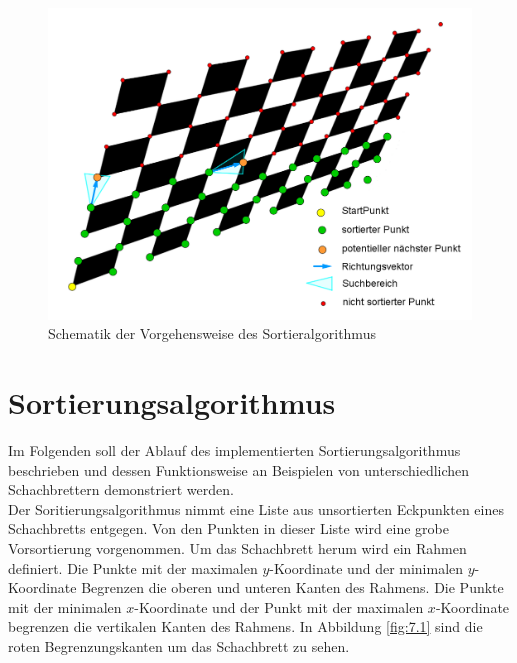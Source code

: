 \begin{figure}[!htb]
	\centering
	\includegraphics[width=0.8\linewidth]{images/VerzeichnetesSchachbretFunktion.png}
	\caption[Funktionsübersicht des Sorieralgorithmus]{Schematik der Vorgehensweise des Sortieralgorithmus}
	\label{fig:UebersichtSortierungsAlg}
\end{figure}




\section{Sortierungsalgorithmus}

Im Folgenden soll der Ablauf des implementierten Sortierungsalgorithmus beschrieben und dessen Funktionsweise an Beispielen von unterschiedlichen Schachbrettern demonstriert werden.\\

Der Soritierungsalgorithmus nimmt eine Liste aus unsortierten Eckpunkten eines Schachbretts entgegen. Von den Punkten in dieser Liste wird eine grobe Vorsortierung vorgenommen. Um das Schachbrett herum wird ein Rahmen definiert. Die Punkte mit der maximalen $y$-Koordinate und der minimalen $y$-Koordinate Begrenzen die oberen und unteren Kanten des Rahmens. Die Punkte mit der minimalen $x$-Koordinate und der Punkt mit der maximalen $x$-Koordinate begrenzen die vertikalen Kanten des Rahmens. In Abbildung \ref{fig:7.1} sind die roten Begrenzungskanten um das Schachbrett zu sehen.\\

